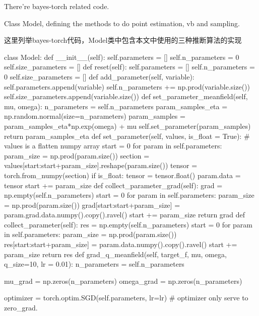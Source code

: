 \documentclass{article}
\begin{document}
There're bayes-torch related code.

Class Model, defining the methods to do point estimation, vb and sampling.

这里列举bayes-torch代码，Model类中包含本文中使用的三种推断算法的实现

\begin{python}

class Model:
    def __init__(self):
        self.parameters = []
        self.n_parameters = 0
        self.size_parameters = []
    def reset(self):
        self.parameters = []
        self.n_parameters = 0
        self.size_parameters = []
    def add_parameter(self, variable):
        self.parameters.append(variable)
        self.n_parameters += np.prod(variable.size())
        self.size_parameters.append(variable.size())
    def set_parameter_meanfield(self, mu, omega):
        n_parameters = self.n_parameters
        param_samples_eta = np.random.normal(size=n_parameters)
        param_samples = param_samples_eta*np.exp(omega) + mu
        self.set_parameter(param_samples)
        return param_samples_eta
    def set_parameter(self, values, is_float = True):
        # values is a flatten numpy array
        start = 0
        for param in self.parameters:
            param_size = np.prod(param.size())
            section = values[start:start+param_size].reshape(param.size())
            tensor = torch.from_numpy(section)
            if is_float:
                tensor = tensor.float()
            param.data = tensor
            start += param_size
    def collect_parameter_grad(self):
        grad = np.empty(self.n_parameters)
        start = 0
        for param in self.parameters:
            param_size = np.prod(param.size())
            grad[start:start+param_size] = param.grad.data.numpy().copy().ravel()
            start += param_size
        return grad
    def collect_parameter(self):
        res = np.empty(self.n_parameters)
        start = 0
        for param in self.parameters:
            param_size = np.prod(param.size())
            res[start:start+param_size] = param.data.numpy().copy().ravel()
            start += param_size
        return res
    def grad_q_meanfield(self, target_f, mu, omega, q_size=10, lr = 0.01):
        n_parameters = self.n_parameters
        
        mu_grad = np.zeros(n_parameters)
        omega_grad = np.zeros(n_parameters)
        
        optimizer = torch.optim.SGD(self.parameters, lr=lr)
        # optimizer only serve to zero_grad.
        

\end{python}
\end{document}
